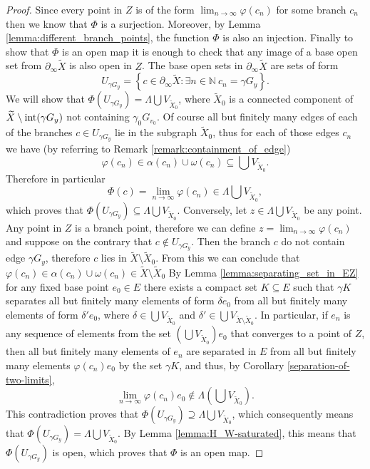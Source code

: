 \documentclass[12pt, a4paper]{article}
\newcommand{\NN}{\mathbb{N}} \newcommand{\ZZ}{\mathbb{Z}}
\newcommand{\8}{\infty}
\newcommand{\set}[1]{\left\{ #1 \right\}}
\theoremstyle{break}
\theoremstyle{defbreak}
\newcommand{\wtl}[1]{\widetilde{#1}}
\begin{document}
\begin{proof}
    Since every point in $Z$ is of the form $\lim_{n\to\8} \varphi(c_n)$ for some branch $c_n$ then we know that $\Phi$ is a surjection. Moreover, by Lemma \ref{lemma:different_branch_points}, the function $\Phi$ is also an injection. Finally to show that $\Phi$ is an open map it is enough to check that any image of a base open set from $\partial_\8\wtl{X}$ is also open in $Z$. The base open sets in $\partial_\8\wtl{X}$ are sets of form
    $$U_{\gamma G_y} = \set{c\in \partial_\8\wtl{X}: \exists n\in \NN\ c_n = \gamma G_y}.$$
    We will show that $\Phi(U_{\gamma G_y}) = \Lambda \bigcup V_{\wtl{X}_0}$, where $\wtl{X}_0$ is a connected component of $\wtl{X}\setminus \hbox{\rm int}(\gamma G_y)$ not containing $\gamma_0 G_{v_0}$. Of course all but finitely many edges of each of the branches $c\in U_{\gamma G_y}$ lie in the subgraph $\wtl{X}_0$, thus for each of those edges $c_n$ we have (by referring to Remark \ref{remark:containment_of_edge})
    $$\varphi(c_n) \in \alpha(c_n)\cup \omega(c_n) \subseteq \bigcup V_{\wtl{X}_0}.$$
    Therefore in particular 
    $$\Phi(c) = \lim_{n\to\8}\varphi(c_n) \in \Lambda \bigcup V_{\wtl{X}_0},$$
    which proves that $\Phi(U_{\gamma G_y})\subseteq \Lambda \bigcup V_{\wtl{X}_0}$. Conversely, let $z\in \Lambda \bigcup V_{\wtl{X}_0}$ be any point. Any point in $Z$ is a branch point, therefore we can define $z = \lim_{n\to\8}\varphi(c_n)$ and suppose on the contrary that $c\not\in U_{\gamma G_y}$. Then the branch $c$ do not contain edge $\gamma G_y$, therefore $c$ lies in $\wtl{X}\setminus \wtl{X}_0$. From this we can conclude that $\varphi(c_n)\in \alpha(c_n)\cup \omega(c_n)\in \wtl{X}\setminus \wtl{X}_0$ By Lemma \ref{lemma:separating_set_in_EZ} for any fixed base point $e_0\in E$ there exists a compact set $K\subseteq E$ such that $\gamma K$ separates all but finitely many elements of form $\delta e_0$ from all but finitely many elements of form $\delta' e_0$, where $\delta \in \bigcup V_{\wtl{X}_0}$ and $\delta' \in \bigcup V_{\wtl{X}\setminus\wtl{X}_0}$. In particular, if $e_n$ is any sequence of elements from the set $(\bigcup V_{\wtl{X}_0})e_0$ that converges to a point of $Z$, then all but finitely many elements of $e_n$ are separated in $E$ from all but finitely many elements $\varphi(c_n)e_0$ by the set $\gamma K$, and thus, by Corollary \ref{separation-of-two-limits}, 
    $$\lim_{n\to\8}\varphi(c_n)e_0 \not\in \Lambda (\bigcup V_{\wtl{X}_0}).$$
    This contradiction proves that $\Phi(U_{\gamma G_y})\supseteq\Lambda \bigcup V_{\wtl{X}_0}$, which consequently means that $\Phi(U_{\gamma G_y})=\Lambda \bigcup V_{\wtl{X}_0}$. By Lemma \ref{lemma:H_W-saturated}, this means that $\Phi(U_{\gamma G_y})$ is open, which proves that $\Phi$ is an open map.
\end{proof}
\end{document}

